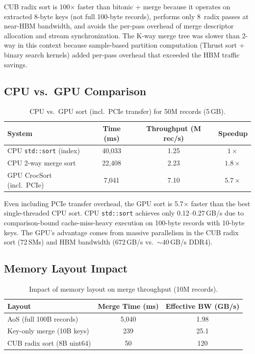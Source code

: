 \documentclass[conference,10pt]{IEEEtran}
\begin{document}
CUB radix sort is 100$\times$ faster than bitonic + merge because it operates
on extracted 8-byte keys (not full 100-byte records), performs only
8~radix passes at near-HBM bandwidth, and avoids the per-pass overhead of
merge descriptor allocation and stream synchronization.  The K-way merge
tree was slower than 2-way in this context because sample-based partition
computation (Thrust sort + binary search kernels) added per-pass overhead
that exceeded the HBM traffic savings.

\subsection{CPU vs.\ GPU Comparison}

\begin{table}[t]
  \centering
  \caption{CPU vs.\ GPU sort (incl.\ PCIe transfer) for 50M records (5\,GB).}
  \label{tab:cpu_gpu}
  \begin{tabular}{@{}lccc@{}}
    \toprule
    \textbf{System} & \textbf{Time (ms)} & \textbf{Throughput (M rec/s)} & \textbf{Speedup} \\
    \midrule
    CPU \texttt{std::sort} (index)  & 40,033 & 1.25 & $1\times$ \\
    CPU 2-way merge sort           & 22,408 & 2.23 & $1.8\times$ \\
    GPU CrocSort (incl.\ PCIe)     &  7,041 & 7.10 & $5.7\times$ \\
    \bottomrule
  \end{tabular}
\end{table}

Even including PCIe transfer overhead, the GPU sort is 5.7$\times$ faster
than the best single-threaded CPU sort.  CPU \texttt{std::sort} achieves
only 0.12--0.27\,GB/s due to comparison-bound cache-miss-heavy execution
on 100-byte records with 10-byte keys.  The GPU's advantage comes from
massive parallelism in the CUB radix sort (72\,SMs) and HBM bandwidth
(672\,GB/s vs.\ ${\sim}40$\,GB/s DDR4).

\subsection{Memory Layout Impact}

\begin{table}[t]
  \centering
  \caption{Impact of memory layout on merge throughput (10M records).}
  \label{tab:layout}
  \begin{tabular}{@{}lcc@{}}
    \toprule
    \textbf{Layout} & \textbf{Merge Time (ms)} & \textbf{Effective BW (GB/s)} \\
    \midrule
    AoS (full 100B records)    & 5,040 & 1.98 \\
    Key-only merge (10B keys)  & 239   & 25.1 \\
    CUB radix sort (8B uint64) & 50    & 120  \\
    \bottomrule
  \end{tabular}
\end{table}
\end{document}
